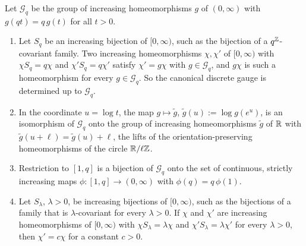 \begin{lemma}
\label{lem:gauge-group}

Let $\mathcal{G}_q$ be the group of increasing homeomorphisms $g$ of $(0,\infty)$ with
$g(qt) = q\,g(t)$ for all $t > 0$.
\begin{enumerate}
\item Let $S_q$ be an increasing bijection of $[0,\infty)$, such as the bijection of a
$q^{\mathbb{Z}}$-covariant family. Two increasing homeomorphisms
$\chi, \chi'$ of $[0,\infty)$ with $\chi S_q = q\chi$ and $\chi'S_q = q\chi'$ satisfy
$\chi' = g\chi$ with $g \in \mathcal{G}_q$, and $g\chi$ is such a homeomorphism for every
$g \in \mathcal{G}_q$. So the canonical discrete gauge is determined up to $\mathcal{G}_q$.
\item In the coordinate $u = \log t$, the map $g \mapsto \tilde g$,
$\tilde g(u) := \log g(e^u)$, is an isomorphism of $\mathcal{G}_q$ onto the group of increasing
homeomorphisms $\tilde g$ of $\mathbb{R}$ with $\tilde g(u + \ell) = \tilde g(u) + \ell$, the lifts of the
orientation-preserving homeomorphisms of the circle $\mathbb{R}/\ell\mathbb{Z}$.
\item Restriction to $[1,q]$ is a bijection of $\mathcal{G}_q$ onto the set of continuous, strictly
increasing maps $\phi : [1,q] \to (0,\infty)$ with $\phi(q) = q\,\phi(1)$.
\item Let $S_\lambda$, $\lambda > 0$, be increasing bijections of $[0,\infty)$, such as the
bijections of a family that is $\lambda$-covariant for every $\lambda > 0$. If $\chi$ and $\chi'$ are
increasing homeomorphisms of $[0,\infty)$ with $\chi S_\lambda = \lambda\chi$ and
$\chi'S_\lambda = \lambda\chi'$ for every $\lambda > 0$, then $\chi' = c\chi$ for a constant
$c > 0$.
\end{enumerate}
\end{lemma}

